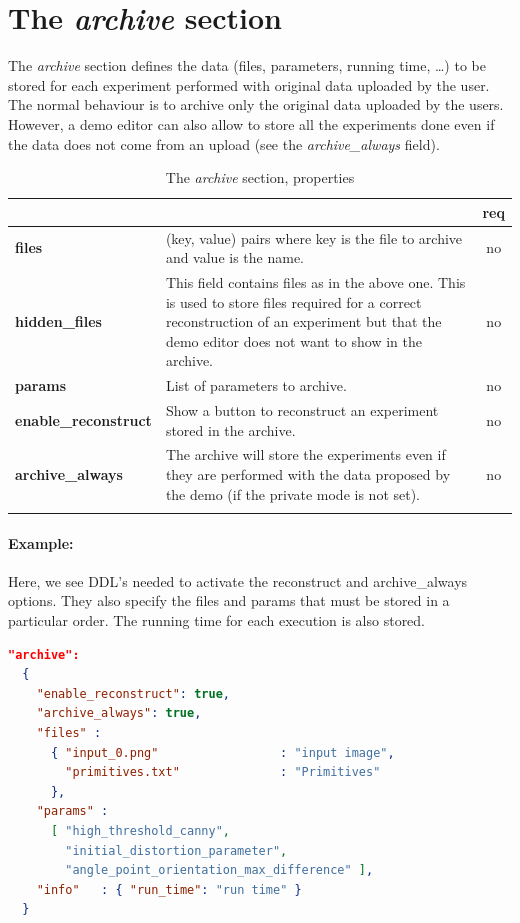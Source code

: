 \section{The \emph{archive} section}

The \emph{archive} section defines the data (files, parameters, running time, \dots) to be stored for each experiment performed with original data uploaded by the user. The normal behaviour is to archive only the original data uploaded by the users. However, a demo editor can also allow to store all the experiments done even if the data does not come from an upload (see the \emph{archive\_always} field).

\begin{longtable}{|>{\bf}L{\linewidth}|L{\linewidth}|c|}
\hline
{}     &  & {\bf req} \tabularnewline 
\hline \hline
 files    & (key, value) pairs where key is the file to archive and value is the name. & no \\ \hline
hidden\_files    & This field contains files as in the above one. This is used to store files required for a correct reconstruction of an experiment but that the demo editor does not want to show in the archive. & no \\ \hline            
 params  & List of parameters to archive. & no \\ \hline
 enable\_reconstruct & Show a button to reconstruct an experiment stored in the archive. & no \\ \hline
 archive\_always     & The archive will store the experiments even if they are performed with the data proposed by the demo (if the private mode is not set). & no \\ \hline
\caption{The \emph{archive} section, properties}
\end{longtable}


\paragraph{Example:}
Here, we see DDL's needed to activate the reconstruct and archive\_always options. They also specify the files and params that must be stored in a particular order. The running time for each execution is also stored.
\\
\begin{lstlisting}[language=json,firstnumber=1]
"archive":
  {
    "enable_reconstruct": true,
    "archive_always": true,
    "files" : 
      { "input_0.png"                 : "input image",
        "primitives.txt"              : "Primitives"
      },
    "params" :  
      [ "high_threshold_canny", 
        "initial_distortion_parameter", 
        "angle_point_orientation_max_difference" ],
    "info"   : { "run_time": "run time" }
  }
\end{lstlisting}


